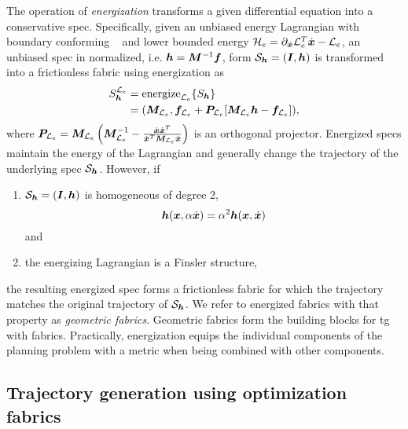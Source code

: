 The operation of \textit{energization} transforms a given differential equation into
a conservative spec.
Specifically, given an unbiased energy Lagrangian \le{} with boundary conforming
\Me{}~\cite[Definition~4.6]{Ratliff2020} and
lower bounded energy $\mathcal{H}_e = \partial_{\dot{\bm{x}}}\mathcal{L}_e^T\dot{\bm{x}} - \mathcal{L}_e$,
an unbiased spec in normalized,
i.e. $\bm{h} = \bm{M}^{-1}\bm{f}$,
form $\mathcal{S}_{\bm{h}} = (\bm{I},\bm{h})$
is transformed into a frictionless fabric using energization as
\begin{equation}
  \begin{split}
  S_{\bm{h}}^{\mathcal{L}_e} &= \text{energize}_{\mathcal{L}_e}\{S_{\bm{h}}\} \\
    &= (\bm{M}_{\mathcal{L}_e}, \bm{f}_{\mathcal{L}_e} + \bm{P}_{\mathcal{L}_e}[\bm{M}_{\mathcal{L}_e}\bm{h} - \bm{f}_{\mathcal{L}_e}]), 
  \end{split}
\end{equation}
where $\bm{P}_{\mathcal{L}_e} = \bm{M}_{\mathcal{L}_e}\left(\bm{M}_{\mathcal{L}_e}^{-1} - \frac{\dot{\bm{x}}\dot{\bm{x}}^T}{\dot{\bm{x}}^T\bm{M}_{\mathcal{L}_e}\dot{\bm{x}}}\right)$ is an
orthogonal projector.
Energized specs maintain the energy of the Lagrangian and generally change
the trajectory of the underlying spec $\mathcal{S}_{\bm{h}}$.
However, if 
\begin{enumerate}
  \item $\mathcal{S}_{\bm{h}} = (\bm{I},\bm{h})$ is homogeneous of degree 2,
    \begin{equation}\bm{h}(\bm{x}, \alpha\dot{\bm{x}}) = \alpha^2\bm{h}(\bm{x}, \dot{\bm{x}})\label{eq:homogeneous}\end{equation}
    and
  \item the energizing Lagrangian is a Finsler structure, 
\end{enumerate}
the resulting energized spec forms a frictionless fabric for which the trajectory matches
the original trajectory of $\mathcal{S}_{\bm{h}}$. We refer to energized fabrics with that
property as \textit{geometric fabrics}. Geometric fabrics form the building blocks for
\ac{tg} with \ac{fabrics}.
Practically, energization equips the individual components of the planning problem
with a metric when being combined with other components.


\subsection{Trajectory generation using optimization fabrics}%
\label{sub:trajectory_generation_using_optimization_fabrics}


